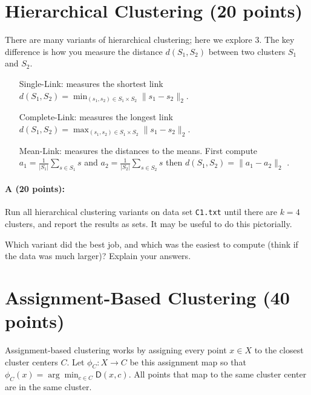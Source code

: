 \documentclass[11pt]{article}
\newcommand{\D}{\textsf{D}}
\begin{document}
\section{Hierarchical Clustering (20 points)}

There are many variants of hierarchical clustering; here we explore $3$.  The key difference is how you measure the distance $d(S_1, S_2)$ between two clusters $S_1$ and $S_2$.  
\begin{itemize}
\item[\textsf{Single-Link: }] measures the shortest link $\displaystyle{d(S_1,S_2) = \min_{(s_1,s_2) \in S_1 \times S_2} \|s_1 - s_2\|_2}$. 

\item[\textsf{Complete-Link: }] measures the longest link $\displaystyle{d(S_1,S_2) = \max_{(s_1,s_2) \in S_1 \times S_2} \|s_1 - s_2\|_2}$. 

\item[\textsf{Mean-Link: }] measures the distances to the means.  First compute 
$a_1 = \frac{1}{|S_1|} \sum_{s \in S_1} s$ and 
$a_2 = \frac{1}{|S_2|} \sum_{s \in S_2} s$ then
$\displaystyle{d(S_1, S_2) = \|a_1 - a_2\|_2}$ .
\end{itemize}

\paragraph{A (20 points):}  
Run all hierarchical clustering variants on data set \texttt{C1.txt} until there are $k=4$ clusters, and report the results as sets.  
It may be useful to do this pictorially.  

Which variant did the best job, and which was the easiest to compute (think if the data was much larger)?  
Explain your answers.  


\section{Assignment-Based Clustering (40 points)}

Assignment-based clustering works by assigning every point $x \in X$ to the closest cluster centers $C$.  Let $\phi_C : X \to C$ be this assignment map so that 
$\phi_C(x) = \arg \min_{c \in C} \D(x,c)$.  All points that map to the same cluster center are in the same cluster.  
\end{document}
